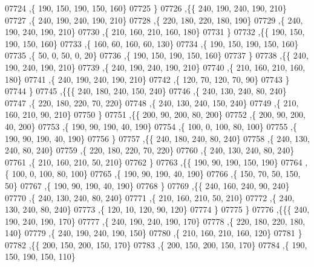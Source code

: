 \begin{DoxyCode}
07724     ,\{   190,   150,   190,   150,   160\}
07725     \}
07726    ,\{\{   240,   190,   240,   190,   210\}
07727     ,\{   240,   190,   240,   190,   210\}
07728     ,\{   220,   180,   220,   180,   190\}
07729     ,\{   240,   190,   240,   190,   210\}
07730     ,\{   210,   160,   210,   160,   180\}
07731     \}
07732    ,\{\{   190,   150,   190,   150,   160\}
07733     ,\{   160,    60,   160,    60,   130\}
07734     ,\{   190,   150,   190,   150,   160\}
07735     ,\{    50,     0,    50,     0,    20\}
07736     ,\{   190,   150,   190,   150,   160\}
07737     \}
07738    ,\{\{   240,   190,   240,   190,   210\}
07739     ,\{   240,   190,   240,   190,   210\}
07740     ,\{   210,   160,   210,   160,   180\}
07741     ,\{   240,   190,   240,   190,   210\}
07742     ,\{   120,    70,   120,    70,    90\}
07743     \}
07744    \}
07745   ,\{\{\{   240,   180,   240,   150,   240\}
07746     ,\{   240,   130,   240,    80,   240\}
07747     ,\{   220,   180,   220,    70,   220\}
07748     ,\{   240,   130,   240,   150,   240\}
07749     ,\{   210,   160,   210,    90,   210\}
07750     \}
07751    ,\{\{   200,    90,   200,    80,   200\}
07752     ,\{   200,    90,   200,    40,   200\}
07753     ,\{   190,    90,   190,    40,   190\}
07754     ,\{   100,     0,   100,    80,   100\}
07755     ,\{   190,    90,   190,    40,   190\}
07756     \}
07757    ,\{\{   240,   180,   240,    80,   240\}
07758     ,\{   240,   130,   240,    80,   240\}
07759     ,\{   220,   180,   220,    70,   220\}
07760     ,\{   240,   130,   240,    80,   240\}
07761     ,\{   210,   160,   210,    50,   210\}
07762     \}
07763    ,\{\{   190,    90,   190,   150,   190\}
07764     ,\{   100,     0,   100,    80,   100\}
07765     ,\{   190,    90,   190,    40,   190\}
07766     ,\{   150,    70,    50,   150,    50\}
07767     ,\{   190,    90,   190,    40,   190\}
07768     \}
07769    ,\{\{   240,   160,   240,    90,   240\}
07770     ,\{   240,   130,   240,    80,   240\}
07771     ,\{   210,   160,   210,    50,   210\}
07772     ,\{   240,   130,   240,    80,   240\}
07773     ,\{   120,    10,   120,    90,   120\}
07774     \}
07775    \}
07776   ,\{\{\{   240,   190,   240,   190,   170\}
07777     ,\{   240,   190,   240,   190,   170\}
07778     ,\{   220,   180,   220,   180,   140\}
07779     ,\{   240,   190,   240,   190,   150\}
07780     ,\{   210,   160,   210,   160,   120\}
07781     \}
07782    ,\{\{   200,   150,   200,   150,   170\}
07783     ,\{   200,   150,   200,   150,   170\}
07784     ,\{   190,   150,   190,   150,   110\}

\end{DoxyCode}
